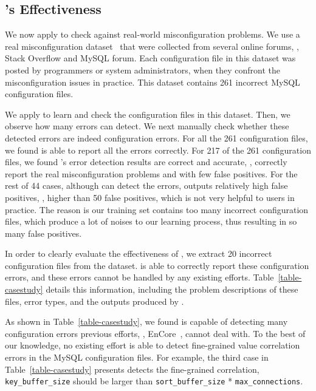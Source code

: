 \subsection{\app's Effectiveness}
\label{subsec-effectiveness}

We now apply \app to check against real-world misconfiguration problems.
We use a real misconfiguration dataset~\cite{configdataset}
that were collected from several online forums, \eg, 
Stack Overflow and MySQL forum.
Each configuration file in this dataset was posted by 
programmers or system administrators, 
when they confront the misconfiguration issues in practice.
This dataset contains 261 incorrect MySQL configuration files.

We apply \app to learn and check the configuration files in this
dataset. Then, we observe how many errors \app can detect.
We next manually check whether these detected errors are indeed
configuration errors.
For all the 261 configuration files, we found \app is
able to report all the errors correctly.
For 217 of the 261 configuration files, we found \app's 
error detection results are correct and accurate,
\ie, correctly report the real misconfiguration problems
and with few false positives.
For the rest of 44 cases, 
although \app can detect the errors,
\app outputs relatively high false positives,
\eg, higher than 50 false positives,
which is not very helpful to users in practice.
The reason is our training set contains too many incorrect configuration
files, which produce a lot of noises to our learning process,
thus resulting in so many false positives.
  
In order to clearly evaluate the effectiveness of \app,
we extract 20 incorrect configuration files from the dataset.
\app is able to correctly report these configuration errors,
and these errors cannot be handled by any existing efforts.
Table~\ref{table-casestudy} details this information,
including the problem descriptions of these files, 
error types, and the outputs produced by \app.


As shown in Table~\ref{table-casestudy},
we found \app is capable of detecting many configuration errors previous
efforts, \eg, EnCore~\cite{zhang14encore}, cannot deal with.
To the best of our knowledge, no existing effort
is able to detect fine-grained value correlation errors in the 
MySQL configuration files.
For example, the third case in Table~\ref{table-casestudy}
presents \app detects the fine-grained correlation,
{\tt key\_buffer\_size} should be larger than 
{\tt sort\_buffer\_size} * {\tt max\_connections}.



